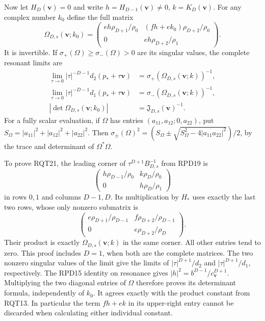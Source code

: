 \documentclass[11pt]{article}
\begin{document}
Now let $H_D(\mathbf v)=0$ and write
$h=H_{D-1}(\mathbf v)\ne0$, $k=K_D(\mathbf v)$.
For any complex number $k_0$ define the full matrix
\[
 \Omega_{D,s}(\mathbf v;k_0)=
 \begin{pmatrix}
  eh\rho_{D+1}/\rho_0&(fh+ek_0)\rho_{D+2}/\rho_0\\
  0&eh\rho_{D+2}/\rho_1
 \end{pmatrix}.
\]
It is invertible.  If $\sigma_+(\Omega)\ge\sigma_-(\Omega)>0$
are its singular values, the complete resonant limits are
\[
 \begin{aligned}
 \lim_{\tau\to0}|\tau|^{-D-1}d_2(p_*+\tau\mathbf v)
   &=\sigma_+(\Omega_{D,s}(\mathbf v;k))^{-1},\\
 \lim_{\tau\to0}|\tau|^{-D-1}d_1(p_*+\tau\mathbf v)
   &=\sigma_-(\Omega_{D,s}(\mathbf v;k))^{-1},\\
 |\det\Omega_{D,s}(\mathbf v;k_0)|
   &=\mathfrak J_{D,s}(\mathbf v)^{-1}.
 \end{aligned}\tag{RQT21}
\]
For a fully scalar evaluation, if $\Omega$ has entries
$(a_{11},a_{12};0,a_{22})$, put
$S_\Omega=|a_{11}|^2+|a_{12}|^2+|a_{22}|^2$.
Then
$\sigma_\pm(\Omega)^2=
(S_\Omega\pm\sqrt{S_\Omega^2-4|a_{11}a_{22}|^2})/2$,
by the trace and determinant of $\Omega^*\Omega$.

To prove RQT21, the leading corner of
$\tau^{D+1}B_{D,s}^{-1}$ from RPD19 is
\[
 \begin{pmatrix}
 h\rho_{D-1}/\rho_0&k\rho_D/\rho_0\\
 0&h\rho_D/\rho_1
 \end{pmatrix}
\]
in rows $0,1$ and columns $D-1,D$.
Its multiplication by $H_*$ uses exactly the last two rows,
whose only nonzero submatrix is
\[
 \begin{pmatrix}
 e\rho_{D+1}/\rho_{D-1}&f\rho_{D+2}/\rho_{D-1}\\
 0&e\rho_{D+2}/\rho_D
 \end{pmatrix}.
\]
Their product is exactly $\Omega_{D,s}(\mathbf v;k)$ in the
same corner.  All other entries tend to zero.  This proof includes
$D=1$, when both are the complete matrices.
The two nonzero singular values of the limit give the limits of
$|\tau|^{D+1}/d_2$ and $|\tau|^{D+1}/d_1$, respectively.
The RPD15 identity on resonance gives
$|h|^2=b^{D-1}/c_{\mathbf v}^{D+1}$.
Multiplying the two diagonal entries of $\Omega$ therefore proves
its determinant formula, independently of $k_0$.
It agrees exactly with the product constant from RQT13.
In particular the term $fh+ek$ in its upper-right entry cannot be
discarded when calculating either individual constant.
\end{document}
